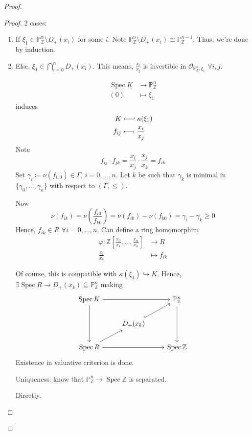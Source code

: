 \documentclass[12pt]{article}
\DeclareMathOperator{\Spec}{Spec}
\theoremstyle{definition}
\begin{document}
\begin{proof}
\begin{enumerate}[label=\arabic*)]
\begin{proof}
2 cases:

\begin{enumerate}[label=(\arabic*)]
\item If $\xi_1\in\mathbb P_\mathbb Z^n\setminus D_+(x_i)$ for some $i$. Note $\mathbb P_\mathbb Z^n\setminus D_+(x_i)\cong\mathbb P_\mathbb Z^{n-1}$. Thus, we're done by induction.

\item Else, $\xi_1\in\bigcap_{i=0}^nD_+(x_i)$. This means, $\frac{x_i}{x_j}$ is invertible in $\mathcal O_{\mathbb P_\mathbb Z^n,\xi_1}$ $\forall i,j$.

\begin{align*}
\Spec K&\longrightarrow\mathbb P_\mathbb Z^n\\(0)&\longmapsto\xi_1
\end{align*}
induces
\begin{align*}
K&\longleftarrow\joinrel\rhook\kappa(\xi_1)\\f_{ij}&\longleftarrow\!\shortmid\frac{x_i}{x_j}
\end{align*}
Note
\[f_{ij}\cdot f_{jk}=\frac{x_i}{x_j}\cdot\frac{x_j}{x_k}=f_{ik}\]
Set $\gamma_i\coloneqq\nu(f_{i,0})\in\Gamma$, $i=0,\ldots,n$. Let $k$ be such that $\gamma_k$ is minimal in $\{\gamma_0,\ldots,\gamma_n\}$ with respect to $(\Gamma,\leq)$.

Now
\[\nu(f_{ik})=\nu\left(\frac{f_{i0}}{f_{k0}}\right)=\nu(f_{i0})-\nu(f_{k0})=\gamma_i-\gamma_k\geq0\]
Hence, $f_{ik}\in R$ $\forall i=0,\ldots,n$. Can define a ring homomorphim
\begin{align*}
\varphi:\mathbb Z\left[\frac{x_0}{x_k},\ldots,\frac{x_n}{x_k}\right]&\longrightarrow R\\\frac{x_i}{x_k}&\longmapsto f_{ik}
\end{align*}

Of course, this is compatible with $\kappa(\xi_1)\hookrightarrow K$. Hence, $\exists\Spec R\rightarrow D_+(x_k)\subseteq\mathbb P_\mathbb Z^n$ making
\[\begin{tikzcd}\Spec K\arrow[rr]\arrow[dd]&&\mathbb P_\mathbb Z^n\arrow[dd]\\&D_+(x_k)\arrow[ru,hook]\\\Spec R\arrow[ru]\arrow[rr]&&\Spec\mathbb Z\end{tikzcd}\]
Existence in valuative criterion is done.

Uniqueness: know that $\mathbb P_\mathbb Z^n\rightarrow\Spec\mathbb Z$ is separated.

Directly.
\end{enumerate}
\end{proof}
\end{enumerate}
\end{proof}
\end{document}
